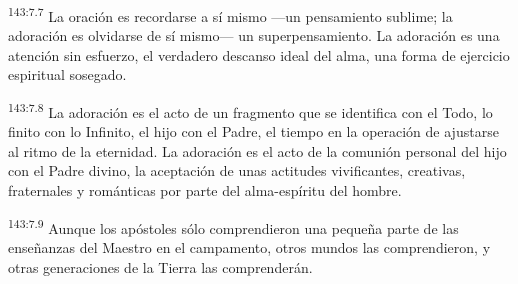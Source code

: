 \par 
\textsuperscript{143:7.7} La oración es recordarse a sí mismo ---un pensamiento sublime; la adoración es olvidarse de sí mismo--- un superpensamiento. La adoración es una atención sin esfuerzo, el verdadero descanso ideal del alma, una forma de ejercicio espiritual sosegado.

\par 
\textsuperscript{143:7.8} La adoración es el acto de un fragmento que se identifica con el Todo, lo finito con lo Infinito, el hijo con el Padre, el tiempo en la operación de ajustarse al ritmo de la eternidad. La adoración es el acto de la comunión personal del hijo con el Padre divino, la aceptación de unas actitudes vivificantes, creativas, fraternales y románticas por parte del alma-espíritu del hombre.

\par 
\textsuperscript{143:7.9} Aunque los apóstoles sólo comprendieron una pequeña parte de las enseñanzas del Maestro en el campamento, otros mundos las comprendieron, y otras generaciones de la Tierra las comprenderán.